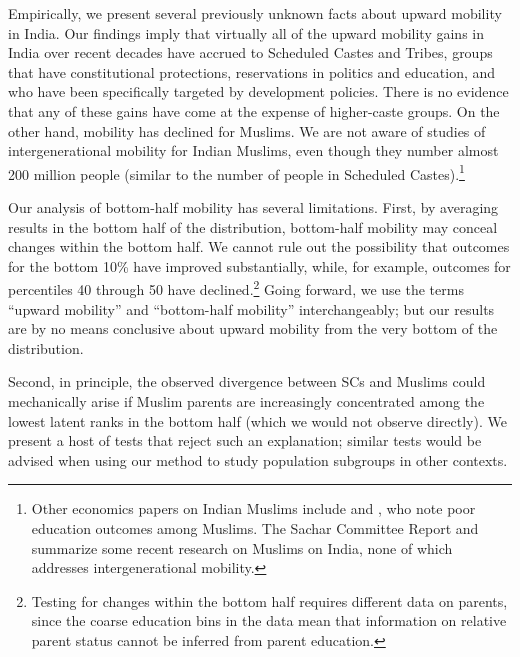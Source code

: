 \documentclass[12pt,letterpaper]{article}
\numberwithin{equation}{section}
\begin{document}
Empirically, we present several previously unknown facts about upward mobility
in India. Our findings imply that virtually all of the upward mobility gains in India over recent decades have accrued to Scheduled Castes and Tribes, groups that have constitutional protections, reservations in politics and education, and who have been specifically targeted by development policies. There is no evidence that any of these gains have come at the expense of higher-caste groups. On the other hand, mobility has declined for Muslims. We are not aware of studies of intergenerational mobility for Indian Muslims, even though they number almost 200 million people (similar to the number of people in Scheduled Castes).\footnote{Other economics papers on Indian Muslims include  and , who note poor education outcomes among Muslims. The Sachar Committee Report \citeyear{sachar2006} and  summarize some recent research on Muslims on India, none of which addresses intergenerational mobility.}

Our analysis of bottom-half mobility has several limitations. First, by averaging results in the bottom half of the distribution, bottom-half mobility may conceal changes within the bottom half. We cannot rule out the possibility that outcomes for the bottom 10\% have improved substantially, while, for example, outcomes for percentiles 40 through 50 have declined.\footnote{Testing for changes within the bottom half requires different data on parents, since the coarse education bins in the data mean that information on relative parent status cannot be inferred from parent education.} Going forward, we use the terms ``upward mobility'' and ``bottom-half mobility'' interchangeably; but our results are by no means conclusive about upward mobility from the very bottom of the distribution.

Second, in principle, the observed divergence between SCs and Muslims could mechanically arise if Muslim parents are increasingly concentrated among the lowest latent ranks in the bottom half (which we would not observe directly). We present a host of tests that reject such an explanation; similar tests would be advised when using our method to study population subgroups in other contexts.
\end{document}
